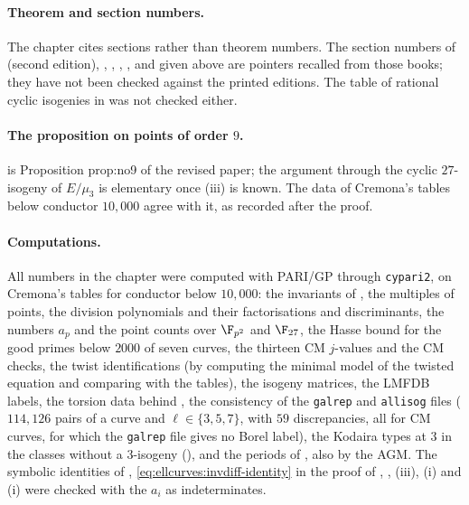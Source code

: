 \paragraph{Theorem and section numbers.} The chapter cites sections rather than theorem numbers. The section numbers of \cite{SilvermanAEC} (second edition), \cite{SilvermanATAEC},
\cite{WashingtonEC}, \cite{Cox}, \cite{Cohen93}, \cite{Cremona97} and \cite{DiamondShurman} given above are pointers recalled from those books; they have not been checked against the printed
editions. The table of rational cyclic isogenies in \cite{LozanoRobledo13} was not checked either.

\paragraph{The proposition on points of order $9$.}  is Proposition prop:no9 of the revised paper; the argument through the cyclic $27$-isogeny of $E/\mu_3$ is
elementary once (iii) is known. The data of Cremona's tables below conductor $10{,}000$ agree with it, as recorded after the proof.

\paragraph{Computations.} All numbers in the chapter were computed with PARI/GP \cite{PARI} through \texttt{cypari2}, on Cremona's tables \cite{ecdata} for conductor below $10{,}000$: the invariants
of , the multiples of points, the division polynomials and their factorisations and discriminants, the numbers $a_p$ and the point counts over $\F_{p^2}$ and
$\F_{27}$, the Hasse bound for the good primes below $2000$ of seven curves, the thirteen CM $j$-values and the CM checks, the twist identifications (by computing the minimal model of the twisted
equation and comparing with the tables), the isogeny matrices, the LMFDB labels, the torsion data behind , the consistency of the \texttt{galrep} and \texttt{allisog} files
($114{,}126$ pairs of a curve and $\ell\in\{3,5,7\}$, with $59$ discrepancies, all for CM curves, for which the \texttt{galrep} file gives no Borel label), the Kodaira types at $3$
in the classes without a $3$-isogeny (), and the periods of , also by the AGM. The symbolic identities of ,
\eqref{eq:ellcurves:invdiff-identity} in the proof of , , (iii), (i) and (i) were checked
with the $a_i$ as indeterminates.
